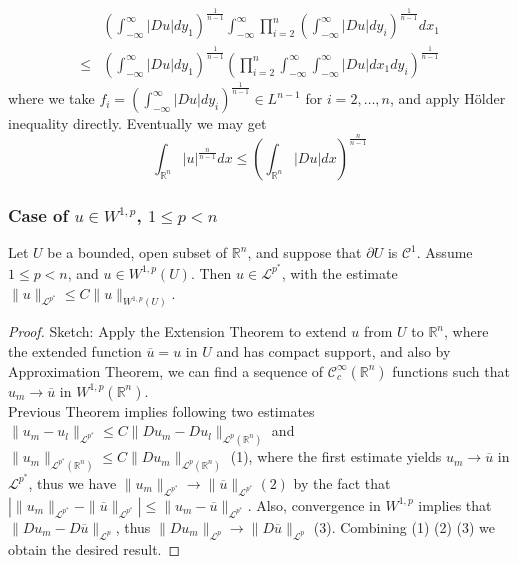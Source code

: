\documentclass{article}
\begin{document}
\begin{align*}
    &\left(\int_{-\infty}^{\infty}|Du|dy_1\right)^{\frac{1}{n-1}}\int_{-\infty}^{\infty}\prod_{i=2}^{n}\left(\int_{-\infty}^{\infty}|Du|dy_i\right)^{\frac{1}{n-1}}dx_1 \\
    \leq& \left(\int_{-\infty}^{\infty}|Du|dy_1\right)^{\frac{1}{n-1}}\left(\prod_{i=2}^{n}\int_{-\infty}^{\infty}\int_{-\infty}^{\infty}|Du|dx_1dy_i\right)^{\frac{1}{n-1}}
\end{align*}
where we take $f_i=\left(\int_{-\infty}^{\infty}|Du|dy_i\right)^{\frac{1}{n-1}}\in L^{n-1}$ for $i=2, \dots, n$, and apply Hölder inequality directly. Eventually we may get
$$
\int_{\mathbb{R}^n}|u|^{\frac{n}{n-1}}dx\leq\left(\int_{\mathbb{R}^n}|Du|dx\right)^{\frac{n}{n-1}}
$$

\subsubsection{Case of $u\in W^{1,p}$, $1\leq p< n$}

\begin{Th}
    Let $U$ be a bounded, open subset of $\mathbb{R}^n$, and suppose that $\partial U$ is $\mathscr{C}^1$. Assume $1\leq p<n$, and $u\in W^{1, p}(U)$. Then $u\in \mathscr{L}^{p^*}$, with the estimate $\|u\|_{\mathscr{L}^{p^*}}\leq C\|u\|_{W^{1, p}(U)}$.
\end{Th}

\begin{proof}
    Sketch: Apply the Extension Theorem to extend $u$ from $U$ to $\mathbb{R}^n$, where the extended function $\overline{u}=u$ in $U$ and has compact support, and also by Approximation Theorem, we can find a sequence of $\mathscr{C}^{\infty}_{c}(\mathbb{R}^n)$ functions such that $u_m\to\overline{u}$ in $W^{1, p}(\mathbb{R}^n)$.\\
    \indent Previous Theorem implies following two estimates $\|u_m-u_l\|_{\mathscr{L}^{p^*}}\leq C\|Du_m-Du_l\|_{\mathscr{L}^{p}(\mathbb{R}^n)}$ and $\|u_{m}\|_{\mathscr{L}^{p^*}(\mathbb{R}^n)}\leq C\|Du_m\|_{\mathscr{L}^{p}(\mathbb{R}^n)}$ (1), where the first estimate yields $u_m\to\overline{u}$ in $\mathscr{L}^{p^*}$, thus we have $\|u_m\|_{\mathscr{L}^{p^*}}\to\|\overline{u}\|_{\mathscr{L}^{p^*}} (2)$ by the fact that $|\|u_m\|_{\mathscr{L}^{p^*}}-\|\overline{u}\|_{\mathscr{L}^{p^*}}|\leq \|u_m-\overline{u}\|_{\mathscr{L}^{p^*}}$. Also, convergence in $W^{1,p}$ implies that $\|Du_m-D\overline{u}\|_{\mathscr{L}^p}$, thus $\|Du_m\|_{\mathscr{L}^{p}}\to\|D\overline{u}\|_{\mathscr{L}^{p}}$ (3). Combining (1) (2) (3) we obtain the desired result.
\end{proof}
\end{document}
